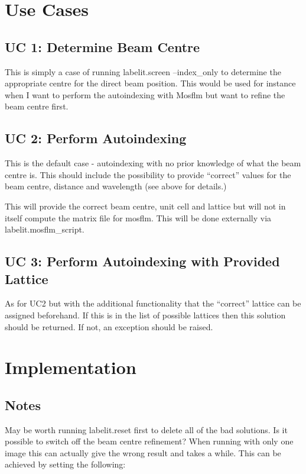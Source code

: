 \documentclass[a4paper, 11pt]{article}
\begin{document}
\section{Use Cases}

\subsection{UC 1: Determine Beam Centre}

This is simply a case of running labelit.screen --index\_only to determine the
appropriate centre for the direct beam position. This would be used for 
instance when I want to perform the autoindexing with Mosflm but want to
refine the beam centre first.

\subsection{UC 2: Perform Autoindexing}

This is the default case - autoindexing with no prior knowledge of what 
the beam centre is. This should include the possibility to provide ``correct''
values for the beam centre, distance and wavelength (see above for details.)

This will provide the correct beam centre, unit cell and lattice but will
not in itself compute the matrix file for mosflm. This will be done externally
via labelit.mosflm\_script.

\subsection{UC 3: Perform Autoindexing with Provided Lattice}

As for UC2 but with the additional functionality that the ``correct'' 
lattice can be assigned beforehand. If this is in the list of possible 
lattices then this solution should be returned. If not, an exception 
should be raised.

\section{Implementation}

\subsection{Notes}

May be worth running labelit.reset first to delete all of the bad solutions.
Is it possible to switch off the beam centre refinement? When running with 
only one image this can actually give the wrong result and takes a while.
This can be achieved by setting the following:
\end{document}
